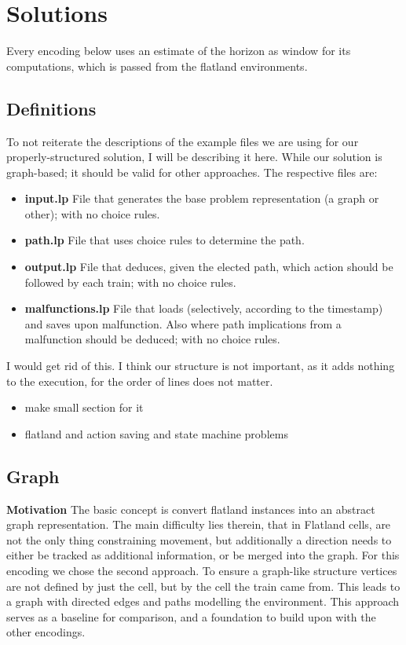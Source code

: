 
\section{Solutions}
Every encoding below uses an estimate of the horizon as window for its computations, which is passed from the flatland environments.
\color{green}
\subsection{Definitions}
To not reiterate the descriptions of the example files we are using for our properly-structured solution, I will be describing it here. While our solution is graph-based; it should be valid for other approaches. The respective files are:
\begin{itemize}
	\item  \textbf{input.lp} File that generates the base problem representation (a graph or other); with no choice rules.
	\item  \textbf{path.lp} File that uses choice rules to determine the path.
	\item  \textbf{output.lp} File that deduces, given the elected path, which action should be followed by each train; with no choice rules.
	\item  \textbf{malfunctions.lp} File that loads (selectively, according to the timestamp) and saves upon malfunction. Also where path implications from a malfunction should be deduced; with no choice rules.
\end{itemize}
\color{black} \color{gray} I would get rid of this. I think our structure is not important, as it adds nothing to the execution, for the order of lines does not matter. \color{black}
\color{blue}
\begin{itemize}
	\item make small section for it
	\item flatland and action saving and state machine problems
\end{itemize}
\color{black}


\subsection{Graph}
\noindent \textbf{Motivation} The basic concept is convert flatland instances into an abstract graph representation. The main difficulty lies therein, that in Flatland cells, are not the only thing constraining movement, but additionally a direction needs to either be tracked as additional information, or be merged into the graph. For this encoding we chose the second approach. To ensure a graph-like structure vertices are not defined by just the cell, but by the cell the train came from. This leads to a graph with directed edges and paths modelling the environment. This approach serves as a baseline for comparison, and a foundation to build upon with the other encodings.\\

